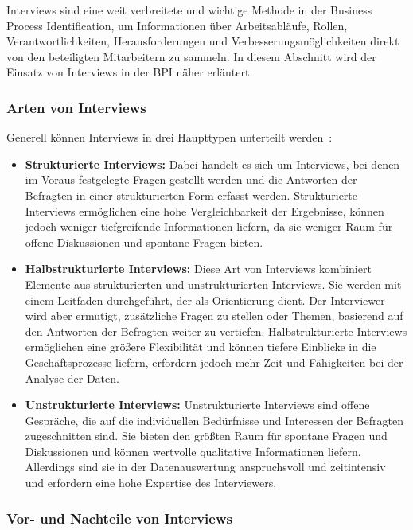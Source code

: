 Interviews sind eine weit verbreitete und wichtige Methode in der Business Process Identification, um Informationen über Arbeitsabläufe, Rollen, Verantwortlichkeiten, Herausforderungen und Verbesserungsmöglichkeiten direkt von den beteiligten Mitarbeitern zu sammeln. In diesem Abschnitt wird der Einsatz von Interviews in der BPI näher erläutert.

\subsubsection{Arten von Interviews}
Generell können Interviews in drei Haupttypen unterteilt werden~\cite[P.9]{Yousuf2015}:

\begin{itemize}
    \item \textbf{Strukturierte Interviews:} Dabei handelt es sich um Interviews, bei denen im Voraus festgelegte Fragen gestellt werden und die Antworten der Befragten in einer strukturierten Form erfasst werden. Strukturierte Interviews ermöglichen eine hohe Vergleichbarkeit der Ergebnisse, können jedoch weniger tiefgreifende Informationen liefern, da sie weniger Raum für offene Diskussionen und spontane Fragen bieten.
    \item \textbf{Halbstrukturierte Interviews:} Diese Art von Interviews kombiniert Elemente aus strukturierten und unstrukturierten Interviews. Sie werden mit einem Leitfaden durchgeführt, der als Orientierung dient. Der Interviewer wird aber ermutigt, zusätzliche Fragen zu stellen oder Themen, basierend auf den Antworten der Befragten weiter zu vertiefen. Halbstrukturierte Interviews ermöglichen eine größere Flexibilität und können tiefere Einblicke in die Geschäftsprozesse liefern, erfordern jedoch mehr Zeit und Fähigkeiten bei der Analyse der Daten.
    \item \textbf{Unstrukturierte Interviews:} Unstrukturierte Interviews sind offene Gespräche, die auf die individuellen Bedürfnisse und Interessen der Befragten zugeschnitten sind. Sie bieten den größten Raum für spontane Fragen und Diskussionen und können wertvolle qualitative Informationen liefern. Allerdings sind sie in der Datenauswertung anspruchsvoll und zeitintensiv und erfordern eine hohe Expertise des Interviewers.
\end{itemize}


\subsubsection{Vor- und Nachteile von Interviews}

